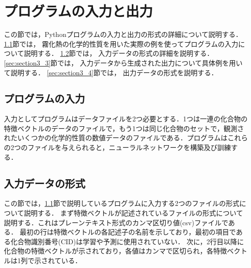 \documentclass[11pt,titlepage,dvipdfmx,twoside]{jarticle}
\begin{document}
\newpage

\section{プログラムの入力と出力}
\label{sec:section3}

この節では，Pythonプログラムの入力と出力の形式の詳細について説明する．
\ref{sec:section3_1}節では，
霧化熱の化学的性質を用いた実際の例を使ってプログラムの入力について説明する．
\ref{sec:section3_2}節では，
入力データの形式の詳細を説明する．
\ref{sec:section3_3}節では，
入力データから生成された出力について具体例を用いて説明する．
\ref{sec:section3_4}節では，
出力データの形式を説明する．

\subsection{プログラムの入力}
\label{sec:section3_1}

入力としてプログラムはデータファイルを2つ必要とする．1つは一連の化合物の特徴ベクトルのデータのファイルで，もう1つは同じ化合物のセットで，観測されたいくつかの化学的性質の数値データのファイルである．プログラムはこれらの2つのファイルを与えられると，ニューラルネットワークを構築及び訓練する．

\bigskip

\subsection{入力データの形式}
\label{sec:section3_2}

この節では，\ref{sec:section3_1}節で説明しているプログラムに入力する2つのファイルの形式について説明する．
まず特徴ベクトルが記述されているファイルの形式について説明する．これはプレーンテキスト形式のカンマ区切り値(csv)ファイルである．
最初の行は特徴ベクトルの各記述子の名前を示しており，最初の項目である化合物識別番号(CID)は学習や予測に使用されていない．
次に，2行目以降に化合物の特徴ベクトルが示されており，各値はカンマで区切られ，各特徴ベクトルは1列で示されている．

\bigskip
\end{document}
